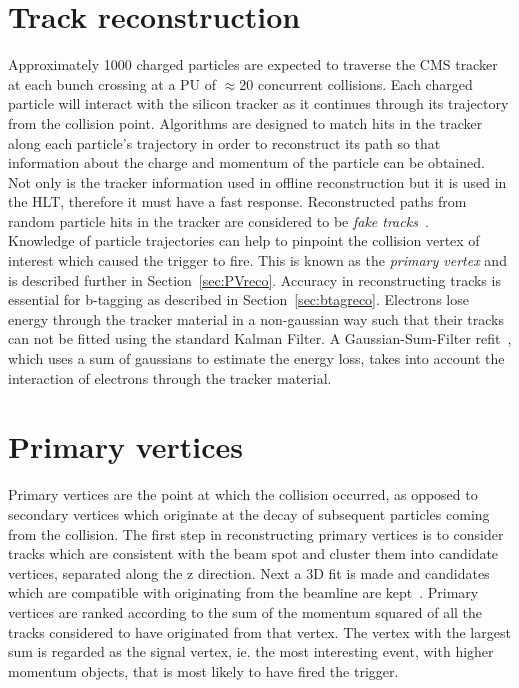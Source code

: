 \section{Track reconstruction}

Approximately 1000 charged particles are expected to traverse the CMS tracker at each bunch crossing at a PU of $\approx 20$ concurrent collisions. Each charged particle will interact with the silicon tracker as it continues through its trajectory from the collision point. Algorithms are designed to match hits in the tracker along each particle's trajectory in order to reconstruct its path so that information about the charge and momentum of the particle can be obtained. Not only is the tracker information used in offline reconstruction but it is used in the HLT, therefore it must have a fast response. Reconstructed paths from random particle hits in the tracker are considered to be \emph{fake tracks}~\cite{1748-0221-9-10-P10009}.\\
Knowledge of particle trajectories can help to pinpoint the collision vertex of interest which caused the trigger to fire. This is known as the \emph{primary vertex} and is described further in Section~\ref{sec:PVreco}. Accuracy in reconstructing tracks is essential for b-tagging as described in Section~\ref{sec:btagreco}.
Electrons lose energy through the tracker material in a non-gaussian way such that their tracks can not be fitted using the standard Kalman Filter. A Gaussian-Sum-Filter refit~\cite{GSF_Electron_Reconstruction_CMS}, which uses a sum of gaussians to estimate the energy loss, takes into account the interaction of electrons through the tracker material.


\section{Primary vertices \label{sec:PVreco}}

Primary vertices are the point at which the collision occurred, as opposed to secondary vertices which originate at the decay of subsequent particles coming from the collision. The first step in reconstructing primary vertices is to consider tracks which are consistent with the beam spot and cluster them into candidate vertices, separated along the z direction. Next a 3D fit is made and candidates which are compatible with originating from the beamline are kept~\cite{Caner1999118}. Primary vertices are ranked according to the sum of the momentum squared of all the tracks considered to have originated from that vertex. The vertex with the largest sum is regarded as the signal vertex, ie. the most interesting event, with higher momentum objects, that is most likely to have fired the trigger. 

